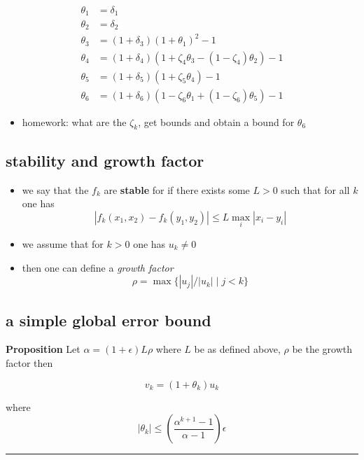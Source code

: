 \documentclass[11pt]{article}
\providecommand{\tightlist}{%
      \setlength{\itemsep}{0pt}\setlength{\parskip}{0pt}}
\begin{document}
\begin{align*}
  \theta_1 &= \delta_1 \\
  \theta_2 &= \delta_2 \\
  \theta_3 &= (1+\delta_3)(1+\theta_1)^2 - 1 \\
  \theta_4 &= (1+\delta_4)(1+\zeta_4\theta_3-(1-\zeta_4)\theta_2) - 1\\
  \theta_5 &= (1+\delta_5)(1+\zeta_5\theta_4)-1\\
  \theta_6 &= (1+\delta_6)(1-\zeta_6\theta_1+(1-\zeta_6)\theta_5)-1
\end{align*}

\begin{itemize}
\tightlist
\item
  homework: what are the \(\zeta_k\), get bounds and obtain a bound for
  \(\theta_6\)
\end{itemize}

\subsection{stability and growth
factor}\label{stability-and-growth-factor}

\begin{itemize}
\tightlist
\item
  we say that the \(f_k\) are \textbf{stable} for if there exists some
  \(L>0\) such that for all \(k\) one has
  \[|f_k(x_1,x_2) - f_k(y_1,y_2)| \leq L \max_i |x_i - y_i|\]
\item
  we assume that for \(k>0\) one has \(u_k \neq 0\)
\item
  then one can define a \emph{growth factor}
  \[\rho = \max \{ |u_j|/|u_k| \mid j < k \}\]
\end{itemize}

\subsection{a simple global error
bound}\label{a-simple-global-error-bound}

\textbf{Proposition} Let \(\alpha=(1+\epsilon)L\rho\) where \(L\) be as
defined above, \(\rho\) be the growth factor then

\[v_k = (1+\theta_k) u_k\]

where
\[|\theta_k| \leq \left(\frac{\alpha^{k+1}-1}{\alpha-1}\right) \epsilon\]

\begin{center}\rule{0.5\linewidth}{\linethickness}\end{center}
\end{document}
